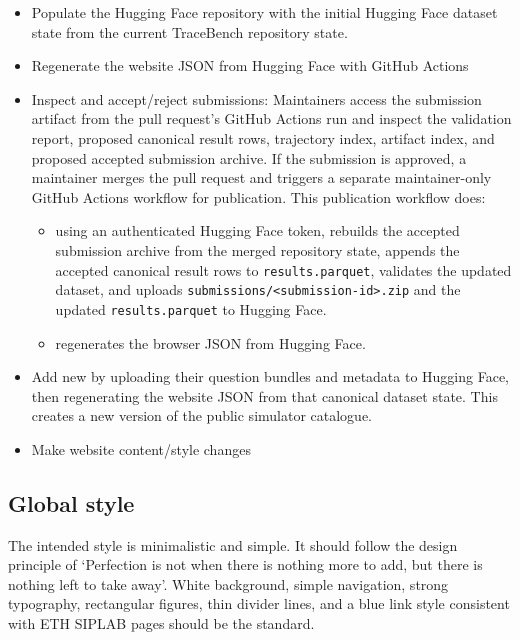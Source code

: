 \documentclass[11pt]{article}
\begin{document}
\begin{itemize}
  \item Populate the Hugging Face repository  with the initial Hugging Face dataset state from the current TraceBench repository state.
  \item Regenerate the website JSON from Hugging Face with GitHub Actions  
  \item {}\label{sec:website-admin-review-submissions}Inspect and accept/reject submissions: Maintainers access the submission artifact from the pull request's GitHub Actions run and inspect the validation report, proposed canonical result rows, trajectory index, artifact index, and proposed accepted submission archive.
  If the submission is approved, a maintainer merges the pull request and triggers a separate maintainer-only GitHub Actions workflow for publication.
  This publication workflow  does:
  \begin{itemize}
    \item using an authenticated Hugging Face token, rebuilds the accepted submission archive from the merged repository state, appends the accepted canonical result rows to \texttt{results.parquet}, validates the updated dataset, and uploads \texttt{submissions/<submission-id>.zip} and the updated \texttt{results.parquet} to Hugging Face.
    \item regenerates the browser JSON from Hugging Face. 
  \end{itemize}
  \item Add new \termSimulators by uploading their question bundles and metadata to Hugging Face, then regenerating the website JSON from that canonical dataset state.
  This creates a new version of the public simulator catalogue.
  \item Make website content/style changes 
\end{itemize}


\label{sec:website-global-style}
\subsection*{Global style}

The intended style is minimalistic and simple. 
It should follow the design principle of `Perfection is not when there is nothing more to add, but there is nothing left to take away'.
White background, simple navigation, strong typography, rectangular figures, thin divider lines, and a blue link style consistent with ETH SIPLAB pages should be the standard.
\end{document}
